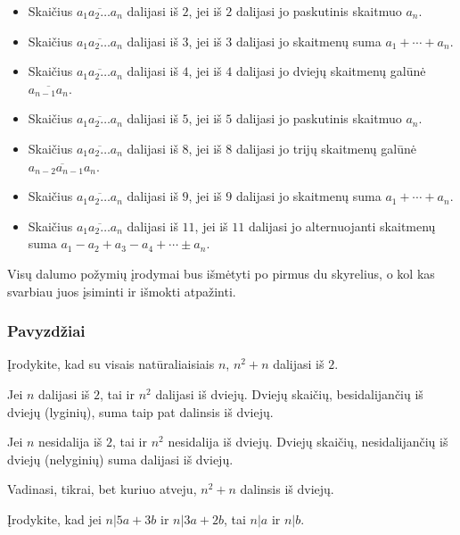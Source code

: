 \begin{itemize} 
  \item Skaičius $\overline{a_1a_2\dots a_n}$ dalijasi iš $2$, jei iš $2$
    dalijasi jo paskutinis skaitmuo $a_n$.  
  \item Skaičius $\overline{a_1a_2\dots a_n}$ dalijasi iš $3$, jei iš $3$
    dalijasi jo skaitmenų suma $a_1 + \cdots + a_n$.  
  \item Skaičius $\overline{a_1a_2\dots a_n}$ dalijasi iš $4$, jei iš $4$
    dalijasi jo dviejų skaitmenų galūnė $\overline{a_{n-1}a_n}$.  
  \item Skaičius $\overline{a_1a_2\dots a_n}$ dalijasi iš $5$, jei iš $5$
    dalijasi jo paskutinis skaitmuo $a_n$.  
  \item Skaičius $\overline{a_1a_2\dots a_n}$ dalijasi iš $8$, jei iš $8$
    dalijasi jo trijų skaitmenų galūnė $\overline{a_{n-2}a_{n-1}a_n}$.  
  \item Skaičius $\overline{a_1a_2\dots a_n}$ dalijasi iš $9$, jei iš $9$
    dalijasi jo skaitmenų suma $a_1 + \cdots + a_n$.  
  \item Skaičius $\overline{a_1a_2\dots a_n}$ dalijasi iš $11$, jei iš $11$
    dalijasi jo alternuojanti skaitmenų suma $a_1 -a_2+a_3-a_4+ \cdots \pm
    a_n$.  
\end{itemize}

Visų dalumo požymių įrodymai bus išmėtyti po pirmus du skyrelius, o kol kas
svarbiau juos įsiminti ir išmokti atpažinti.

\subsubsection{Pavyzdžiai}

\begin{pavnr} Įrodykite, kad su visais natūraliaisiais $n$, $n^2 + n$
  dalijasi iš $2$.  
\end{pavnr}

\begin{sprendimas}
  Jei $n$ dalijasi iš $2$, tai ir $n^2$ dalijasi iš dviejų. Dviejų skaičių,
  besidalijančių iš dviejų (lyginių), suma taip pat dalinsis iš dviejų.

  Jei $n$ nesidalija iš $2$, tai ir $n^2$ nesidalija iš dviejų. Dviejų
  skaičių, nesidalijančių iš dviejų (nelyginių) suma dalijasi iš dviejų. 

  Vadinasi, tikrai, bet kuriuo atveju, $n^2 + n$ dalinsis iš dviejų.
\end{sprendimas}

\begin{pavnr} 
  Įrodykite, kad jei $n|5a + 3b$ ir $n|3a+2b$, tai $n|a$ ir $n|b$.
\end{pavnr}

